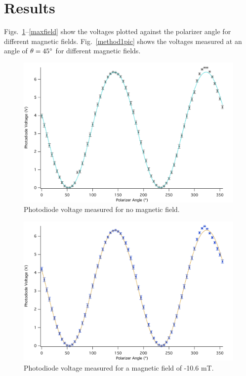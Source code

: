 \documentclass[prb,preprint]{revtex4-1}
\begin{document}
\section{Results}
{Figs.~\ref{nofield}--\ref{maxfield} show the voltages plotted against the polarizer angle for different magnetic fields. Fig.~\ref{method1pic} shows the voltages measured at an angle of $\theta=45\degree$ for different magnetic fields. 
\begin{figure}[h]
\includegraphics[width = 5.8in]{0A.pdf}
\caption{\label{nofield}Photodiode voltage measured for no magnetic field.}
\end{figure}

\begin{figure}
\includegraphics[width = 5.8in]{n1A.pdf}
\caption{\label{neg}Photodiode voltage measured for a magnetic field of -10.6 mT.}
\end{figure}

}
\end{document}
